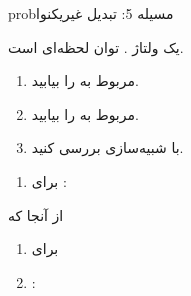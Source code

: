 \begin{PSbox}[unbreakable]{prob}{مسیله 5: تبدیل غیریکنوا}

یک ولتاژ . توان لحظه‌ای  است.

\begin{enumerate}
\def\labelenumi{(\alph{enumi})}
\tightlist
\item
   مربوط به  را بیابید.
\item
   مربوط به  را بیابید.
\item
  با شبیه‌سازی  بررسی کنید.
\end{enumerate}

\PSsolution{} 

\begin{enumerate}
\def\labelenumi{(\alph{enumi})}
\tightlist
\item
  برای :\PSbr{}
\end{enumerate}

از آنجا که 


\begin{enumerate}
\def\labelenumi{(\alph{enumi})}
\setcounter{enumi}{1}
\item
   برای 
\item
  :
\end{enumerate}



\end{PSbox}
